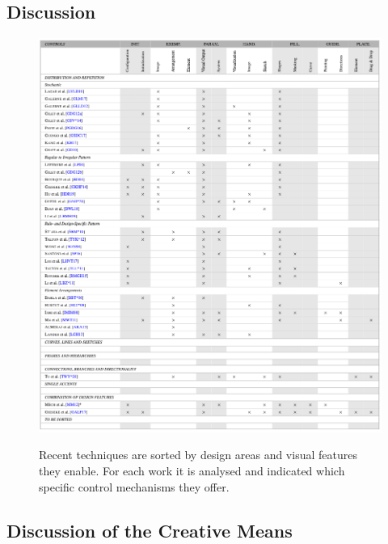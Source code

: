 

\subsection{Discussion}
\label{subsec:analysis_discussion}




\begin{figure}
    \centering
    \includegraphics[width=\textwidth]{tables/table_all.png}
    \label{table:analysis}
    \caption[Control mechanisms in the state of the art]{Recent techniques are sorted by design areas and visual features they enable. For each work it is analysed and indicated which specific control mechanisms they offer.}
\end{figure}




\subsection{Discussion of the Creative Means}
\label{subsec:analysis_creative_means}

